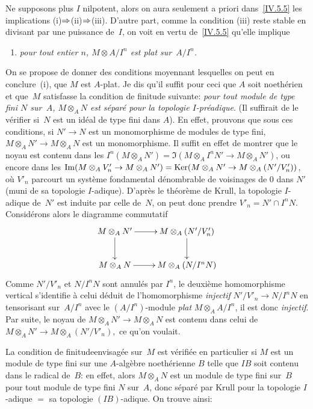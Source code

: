 Ne supposons plus $I$ nilpotent, alors on aura seulement a priori
dans~\ref{IV.5.5} les implications (i)$\To$(ii)$\To$(iii). D'autre part, comme la condition (iii) reste
stable en divisant par une puissance de~$I$, on voit en vertu
de~\ref{IV.5.5} qu'elle implique
\begin{enumerate}
\item[(iv)] \emph{pour tout entier $n$, $M \otimes A/I^n$ est plat sur~$A/I^n$.}
\end{enumerate}
On se propose de donner des conditions moyennant lesquelles on peut
en conclure~(i), \ie que $M$ est $A$-plat. Je dis qu'il suffit pour
ceci que $A$ soit noeth\'erien et que~$M$ satisfasse la condition de
finitude suivante: \emph{pour tout module de type fini $N$ sur~$A$, $M
\otimes_A N$ est séparé pour la topologie
$I$-préadique}. (Il suffirait de le v\'erifier si~$N$ est un
id\'eal de type fini dans $A$). En effet, prouvons que sous ces
conditions, si $N' \to N$ est un monomorphisme de modules de type
fini, $M \otimes_A N' \to M \otimes_A N$ est un monomorphisme. Il
suffit en effet de montrer que le noyau est contenu dans les $I^n(M
\otimes_A N') = \Im(M \otimes_A I^n N' \to M \otimes_A N')$, ou encore
dans les $\Im(M \otimes_A V'_n \to M \otimes_A N') = \Ker (M \otimes_A
N' \to M \otimes_A (N'/V'_n))$, o\`u $V'_n$ parcourt un syst\`eme
fondamental d\'enombrable de voisinages de 0 dans $N'$ (muni de sa
topologie $I$-adique). D'apr\`es le th\'eor\`eme de Krull, la
topologie $I$-adique de~$N'$ est induite par celle de~$N$, on peut
donc prendre $V'_n = N' \cap I^n N$. Consid\'erons alors le
diagramme commutatif
$$
\xymatrix{{M \otimes_A N'}\ar[r]\ar[d]&{M \otimes_A (N'/V'_n)}\ar[d]\\{M \otimes_A N}\ar[r]&{M \otimes_A (N / I^n N)}}
$$
Comme $N'/V'_n$ et $N/I^n N$ sont annul\'es par $I^n$, le
deuxi\`eme homomorphisme vertical s'identifie \`a celui d\'eduit
de l'homomorphisme \emph{injectif} $N'/V'_n \to N/I^n N$ en
tensorisant sur~$A/I^n$ avec le $(A/I^n)$-module \emph{plat} $M
\otimes_A A/I^n$, il est donc \emph{injectif}. Par suite, le noyau de
$M \otimes_A N' \to M \otimes_A N$ est contenu dans celui de~$M
\otimes_A N' \to M \otimes_A (N'/V'_n),$ ce qu'on voulait.

La condition de \og finitude\fg envisag\'ee sur~$M$ est
v\'erifi\'ee en particulier si $M$ est un module de type fini sur
une $A$-alg\`ebre
noeth\'erienne
$B$ telle que $IB$ soit contenu
dans le radical de~$B$: en effet, alors $M \otimes_A N$ est un module
de type fini sur~$B$ pour tout module de type fini $N$ sur~$A$, donc
s\'epar\'e par Krull pour la topologie $I$-adique $=$ sa topologie
$(IB)$-adique. On trouve ainsi:

